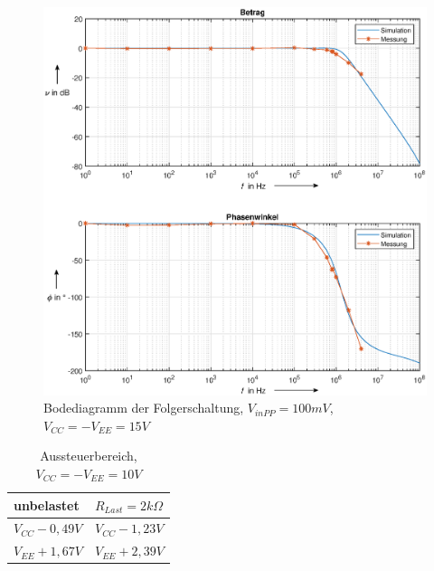 \begin{figure}[H]
    \centering
    \includegraphics[width=\costumPlotWidth]{Lab_1/Plots/Folger.eps}
    \caption{Bodediagramm der Folgerschaltung, $V_{inPP}=100mV$, $V_{CC}=-V_{EE}=15V$}
    \label{fig:Bode_Folger_ua741}
\end{figure}

\begin{table}[H]
\centering
\caption{Aussteuerbereich,  $V_{CC}=-V_{EE}=10V$}
\label{tab:Clip_Folger_ua741}
\begin{tabular}{|l|l|}
\hline
unbelastet       & $R_{Last} = 2k\Omega$ \\ \hline
$V_{CC} - 0,49V$ & $V_{CC} - 1,23V$      \\ \hline
$V_{EE} + 1,67V$ & $V_{EE} + 2,39V$      \\ \hline
\end{tabular}
\end{table}

